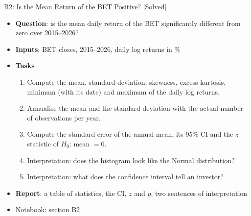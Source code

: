 \begin{frame}{B2: Is the Mean Return of the BET Positive? [Solved]}
\itemsize{\footnotesize}
\begin{itemize}
\item \textbf{Question}: is the mean daily return of the BET significantly different from zero over 2015--2026?
\item \textbf{Inputs}: BET closes, 2015--2026, daily log returns in \%
\item \textbf{Tasks}
\begin{enumerate}
    \item Compute the mean, standard deviation, skewness, excess kurtosis, minimum (with its date) and maximum of the daily log returns.
    \item Annualise the mean and the standard deviation with the actual number of observations per year.
    \item Compute the standard error of the annual mean, its 95\% CI and the $z$ statistic of $H_0$: mean $= 0$.
    \item Interpretation: does the histogram look like the Normal distribution?
    \item Interpretation: what does the confidence interval tell an investor?
\end{enumerate}
\item \textbf{Report}: a table of statistics, the CI, $z$ and $p$, two sentences of interpretation
\item Notebook: section B2
\end{itemize}
\end{frame}

